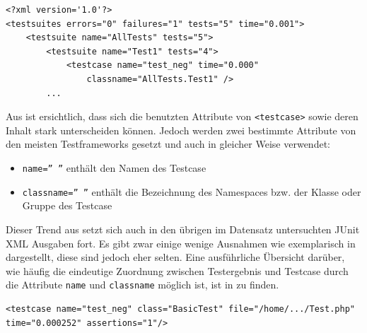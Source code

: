 \begin{lstlisting}[caption={JUnit XML, erzeugt durch das Haskell-Testframework tasty mit dem ant-Plugin.\\ ''\textellipsis{}'' bezeichnet gekürzte Stellen.}, label={JUNITtasty}]
<?xml version='1.0'?>
<testsuites errors="0" failures="1" tests="5" time="0.001">
    <testsuite name="AllTests" tests="5">
        <testsuite name="Test1" tests="4">
            <testcase name="test_neg" time="0.000"
                classname="AllTests.Test1" />
        ...
\end{lstlisting}

Aus  ist ersichtlich, dass sich die benutzten Attribute von \texttt{<testcase>} sowie deren Inhalt stark unterscheiden können. Jedoch werden zwei bestimmte Attribute von den meisten Testframeworks gesetzt und auch in gleicher Weise verwendet:
\begin{itemize}
    \item \texttt{name='' ''} enthält den Namen des Testcase
    \item \texttt{classname='' ''} enthält die Bezeichnung des Namespaces bzw. der Klasse oder Gruppe des Testcase
\end{itemize}
Dieser Trend aus  setzt sich auch in den übrigen im Datensatz untersuchten JUnit XML Ausgaben fort. Es gibt zwar einige wenige Ausnahmen wie exemplarisch in  dargestellt, diese sind jedoch eher selten. Eine ausführliche Übersicht darüber, wie häufig die eindeutige Zuordnung zwischen Testergebnis und Testcase durch die Attribute \texttt{name} und \texttt{classname} möglich ist, ist in  zu finden.

\begin{lstlisting}[caption={JUnit XML für den Testcase \texttt{test\_neg}, erzeugt durch das PHP-Testframework codeception. Codeception benutzt statt des häufig verwendeten Attribut ''classname'' das Attribut ''class''.\\ ''\textellipsis{}'' bezeichnet gekürzte Stellen.}, label={JUNITcodeception}]
<testcase name="test_neg" class="BasicTest" file="/home/.../Test.php" time="0.000252" assertions="1"/>
\end{lstlisting}

